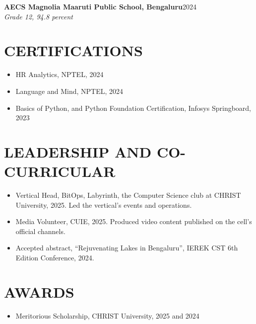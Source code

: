 \documentclass[10pt,letterpaper]{article}
\newcommand{\entry}[3]{%
  \textbf{#1}\hfill #2\\
  \textit{#3}\\[1pt]%
}
\begin{document}
\entry{AECS Magnolia Maaruti Public School, Bengaluru}{2024}
      {Grade 12, 94.8 percent}

\section{CERTIFICATIONS}

\begin{itemize}
  \item HR Analytics, NPTEL, 2024
  \item Language and Mind, NPTEL, 2024
  \item Basics of Python, and Python Foundation Certification, Infosys
        Springboard, 2023
\end{itemize}

\section{LEADERSHIP AND CO-CURRICULAR}

\begin{itemize}
  \item Vertical Head, BitOps, Labyrinth, the Computer Science club at CHRIST
        University, 2025. Led the vertical's events and operations.
  \item Media Volunteer, CUIE, 2025. Produced video content published on the
        cell's official channels.
  \item Accepted abstract, ``Rejuvenating Lakes in Bengaluru'', IEREK CST 6th
        Edition Conference, 2024.
\end{itemize}

\section{AWARDS}

\begin{itemize}
  \item Meritorious Scholarship, CHRIST University, 2025 and 2024
\end{itemize}
\end{document}
